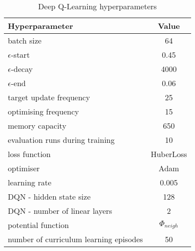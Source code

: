 \begin{table}[h]
\begin{threeparttable}
\centering
\begin{tabular}{l|c}
\toprule
Hyperparameter             &     Value \\
\midrule
batch size               &     64 \\ 
$\epsilon$-start               &    0.45 \\ 
$\epsilon$-decay         &     4000\\
$\epsilon$-end              &     0.06 \\
target update frequency               &     25 \\ 
optimising frequency          &     15 \\ 
memory capacity     &     650 \\
evaluation runs during training             &     10 \\
loss function               &     HuberLoss \\ 
optimiser        &     Adam \\
learning rate             &     0.005 \\
DQN - hidden state size               &     128 \\ 
DQN - number of linear layers     &     2 \\
potential function            &    $\Phi_{neigh}$ \\
number of curriculum learning episodes            & 50 \\ 
\bottomrule
\end{tabular}
\end{threeparttable}
\caption{\textsc{\GraphicalTwoChoice} Deep Q-Learning hyperparameters}
\label{tab:graphical-two-choice-hyperparameters}
\end{table}